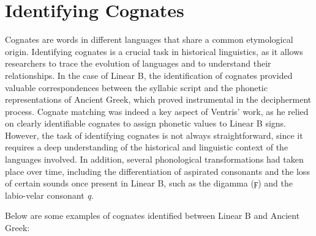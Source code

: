 \section{Identifying Cognates}
Cognates are words in different languages that share a common etymological origin.  
Identifying cognates is a crucial task in historical linguistics, as it allows researchers to trace the evolution of languages and to understand their relationships.  
In the case of Linear B, the identification of cognates provided valuable correspondences between the syllabic script and the phonetic representations of Ancient Greek, which proved instrumental in the decipherment process.  
Cognate matching was indeed a key aspect of Ventris' work, as he relied on clearly identifiable cognates to assign phonetic values to Linear B signs.  
However, the task of identifying cognates is not always straightforward, since it requires a deep understanding of the historical and linguistic context of the languages involved.  
In addition, several phonological transformations had taken place over time, including the differentiation of aspirated consonants and the loss of certain sounds once present in Linear B, such as the digamma ({\textgreek{ϝ}}) and the labio-velar consonant \textit{q}.  

Below are some examples of cognates identified between Linear B and Ancient Greek:  

